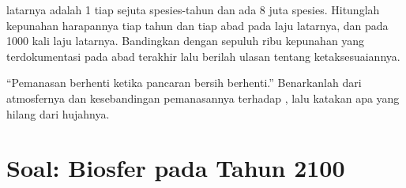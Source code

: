 \begin{exercise}[$\star\star\star$]\label{exo:b2:global-change:11}
 latarnya adalah 1 tiap sejuta spesies-tahun dan ada 8
juta spesies. Hitunglah kepunahan harapannya tiap tahun dan tiap abad
pada laju latarnya, dan pada 1000 kali laju latarnya. Bandingkan dengan
sepuluh ribu kepunahan yang terdokumentasi pada abad terakhir lalu
berilah ulasan tentang ketaksesuaiannya.
\end{exercise}

\begin{exercise}[$\star\star\star$]\label{exo:b2:global-change:12}
``Pemanasan berhenti ketika pancaran bersih berhenti.'' Benarkanlah
dari  atmosfernya dan kesebandingan pemanasannya terhadap
, lalu katakan apa yang hilang dari hujahnya.
\end{exercise}

\section{Soal: Biosfer pada Tahun 2100}

